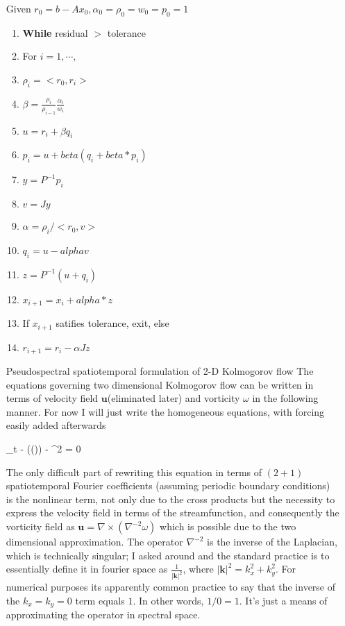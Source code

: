 \begin{itemize}
Given $r_0= b - Ax_0, \alpha_0 = \rho_0 = w_0 =p_0 = 1$
\begin{enumerate}
\item \textbf{While} residual $>$ tolerance
\item For $i = 1, \cdots , $
\item $\rho_i = <r_0, r_i>$
\item $\beta = \frac{\rho_i}{\rho_{i-1}} \frac{\alpha_i}{w_i}$
\item $u = r_i + \beta q_i$
\item $p_i = u + beta(q_i +beta*p_i)$
\item $y = P^{-1}p_i$
\item $v = J y$
\item $\alpha = \rho_i / <r_0,v>$
\item $q_i = u - alpha v$
\item $z = P^{-1}(u+q_i)$
\item $x_{i+1} = x_i + alpha * z$
\item If $x_{i+1}$ satifies tolerance, exit, else
\item $r_{i+1} = r_i - \alpha J z$
\end{enumerate}


\item[Pseudospectral spatiotemporal formulation of 2-D Kolmogorov flow]
The equations governing two dimensional Kolmogorov flow can be written in terms
of velocity field $\mathbf{u}$(eliminated later) and vorticity $\omega$ in the
following manner. For now I will just write the homogeneous equations, with
forcing easily added afterwards

\beq
\omega_t - \cdot(\nabla \times (\times \omega {})) - \nabla^2 \omega = 0
\eeq

The only difficult part of rewriting this equation in terms of $(2+1)$ spatiotemporal Fourier coefficients
(assuming periodic boundary conditions) is the nonlinear term, not only due to the cross products
but the necessity to express the velocity field in terms of the streamfunction, and consequently the
vorticity field as $\mathbf{u} = \nabla \times (\nabla^{-2} \omega)$
which is possible due to the two dimensional approximation. The operator $\nabla^{-2}$ is the inverse
of the Laplacian, which is technically singular; I asked around and the standard practice is to essentially
define it in fourier space as $\frac{1}{|\mathbf{k}|^2}$, where $|\mathbf{k}|^2 = k_x^2 + k_y^2$. For
numerical purposes its apparently common practice to say that the inverse of the $k_x = k_y = 0 $
term equals $1$. In other words, $1/0 = 1$. It's just a means of approximating the operator in
spectral space.


\end{itemize}
